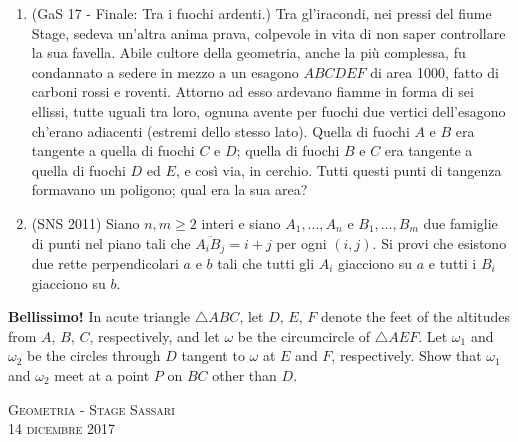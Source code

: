 \documentclass[a4paper]{article}
\theoremstyle{remark}
\theoremstyle{definition}
\begin{document}
\begin{enumerate}
\item (GaS 17 - Finale: Tra i fuochi ardenti.) 
Tra gl’iracondi, nei pressi del fiume Stage, sedeva un’altra anima prava, colpevole in vita di non saper controllare la sua
favella. Abile cultore della geometria, anche la più complessa, fu condannato a sedere in mezzo a un esagono $ ABCDEF $
di area 1000, fatto di carboni rossi e roventi. Attorno ad esso ardevano fiamme in forma di sei ellissi, tutte uguali tra loro,
ognuna avente per fuochi due vertici dell’esagono ch’erano adiacenti (estremi dello stesso lato). Quella di fuochi $ A $ e $ B $
era tangente a quella di fuochi $ C $ e $ D $; quella di fuochi $ B $ e $ C $ era tangente a quella di fuochi $ D $ ed $ E $, e così via, in
cerchio. Tutti questi punti di tangenza formavano un poligono; qual era la sua area?

\item (SNS 2011)
Siano $ n, m \geq 2 $ interi e siano $ A_1 , \dots, A_n $ e $ B_1 , \dots , B_m $ due famiglie di punti nel piano tali che $ \overline{A_iB_j} = i + j $ per ogni $ (i, j) $. Si provi che esistono due rette perpendicolari $ a $ e $ b $ tali che tutti gli $ A_i $ giacciono su $ a $ e tutti i $ B_i $ giacciono su $ b $.

\end{enumerate}

\textbf{Bellissimo!} In acute triangle $ \triangle ABC $, let $ D,\, E,\, F $ denote the feet of the altitudes from
$ A,\, B,\, C $, respectively, and let $ \omega $ be the circumcircle of $\triangle AEF $. Let $ \omega_1 $ and $ \omega_2 $ be the circles through $ D $ tangent to $ \omega $ at $ E $ and $ F $, respectively. Show that $ \omega_1 $ and $ \omega_2 $ meet at a point $ P $ on $ BC $ other than $ D $.


\begin{center}
	\vspace*{0,5 cm}
	{\Huge \textsc{Geometria - Stage Sassari}} \\
	\vspace{0,5 cm}
	\textsc{\Author} \hspace{1cm} \textsc{14 dicembre 2017}
	\thispagestyle{empty}
	\vspace{0,7 cm}
\end{center}
\normalsize
\end{document}
